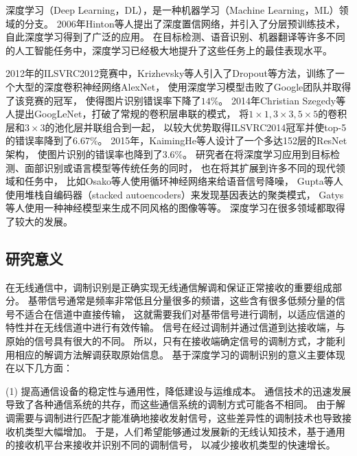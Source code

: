 深度学习（Deep Learning，DL），是一种机器学习（Machine Learning，ML）领域的分支。
2006年Hinton等人提出了深度置信网络\cite{hinton2006fast}，并引入了分层预训练技术，自此深度学习得到了广泛的应用。
在目标检测、语音识别、机器翻译等许多不同的人工智能任务中，深度学习已经极大地提升了这些任务上的最佳表现水平\cite{lecun2015deep}。 \par

2012年的ILSVRC2012竞赛中，Krizhevsky等人引入了Dropout等方法，训练了一个大型的深度卷积神经网络AlexNet，
使用深度学习模型击败了Google团队并取得了该竞赛的冠军，
使得图片识别错误率下降了$14\%$\cite{krizhevsky2012imagenet}。
2014年Christian Szegedy等人提出GoogLeNet，打破了常规的卷积层串联的模式，
将$1 \times 1, 3 \times 3, 5 \times 5$的卷积层和$3 \times 3$的池化层并联组合到一起，
以较大优势取得ILSVRC2014冠军并使top-5的错误率降到了$6.67\%$\cite{Szegedy_2015_CVPR}。
2015年，KaimingHe等人设计了一个多达152层的ResNet架构，
使图片识别的错误率也降到了$3.6\%$\cite{he2016deep}。
研究者在将深度学习应用到目标检测、面部识别或语言模型等传统任务的同时，
也在将其扩展到许多不同的现代领域和任务中，
比如Osako等人使用循环神经网络来给语音信号降噪\cite{osako2015complex}，
Gupta等人使用堆栈自编码器（stacked autoencoders）来发现基因表达的聚类模式\cite{gupta2015learning}，
Gatys等人使用一种神经模型来生成不同风格的图像\cite{gatys2015neural}等等。
深度学习在很多领域都取得了较大的发展。\par

\subsection{研究意义}

在无线通信中，调制识别是正确实现无线通信解调和保证正常接收的重要组成部分。
基带信号通常是频率非常低且分量很多的频谱，这些含有很多低频分量的信号不适合在信道中直接传输，
这就需要我们对基带信号进行调制，以适应信道的特性并在无线信道中进行有效传输。
信号在经过调制并通过信道到达接收端，与原始的信号具有很大的不同。
所以，只有在接收端确定信号的调制方式，才能利用相应的解调方法解调获取原始信息。
基于深度学习的调制识别的意义主要体现在以下几方面：\par

(1) 提高通信设备的稳定性与通用性，降低建设与运维成本。
通信技术的迅速发展导致了各种通信系统的共存，而这些通信系统的调制方式可能各不相同。
由于解调需要与调制进行匹配才能准确地接收发射信号，这些差异性的调制技术也导致接收机类型大幅增加。
于是，人们希望能够通过发展新的无线认知技术，基于通用的接收机平台来接收并识别不同的调制信号，
以减少接收机类型的快速增长。 \par

